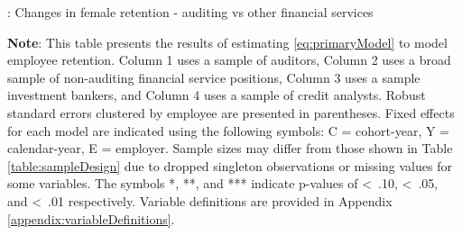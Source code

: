 \documentclass[11pt]{article}
\begin{document}
\clearpage
\begin{table}[!htbp]
    \begin{threeparttable}[b]
        
        \captionsetup{labelfont=bf, singlelinecheck=off, justification=raggedright, labelsep=none}
        \caption{: Changes in female retention - auditing vs other financial services}  
        
        \raggedright
        \hspace*{-\leftmargin}
        \vspace*{-0.75cm}
        \small

        \noindent
        
        
        \begin{tablenotes}
            \footnotesize
            \item \textbf{Note}: This table presents the results of estimating \ref{eq:primaryModel} to model employee retention. Column 1 uses a sample of auditors, Column 2 uses a broad sample of non-auditing financial service positions, Column 3 uses a sample investment bankers, and Column 4 uses a sample of credit analysts. Robust standard errors clustered by employee are presented in parentheses. Fixed effects for each model are indicated using the following symbols: C = cohort-year, Y = calendar-year, E = employer. Sample sizes may differ from those shown in Table \ref{table:sampleDesign} due to dropped singleton observations or missing values for some variables. The symbols *, **, and *** indicate p-values of \textless\, .10, \textless\, .05, and \textless\, .01 respectively. Variable definitions are provided in Appendix \ref{appendix:variableDefinitions}. 
        \end{tablenotes}
        \label{table:interactionModels}
    \end{threeparttable}
\end{table}
\end{document}
